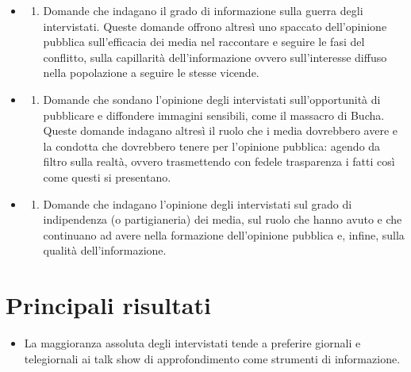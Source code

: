 \documentclass[
  openany]{book}
\providecommand{\tightlist}{%
  \setlength{\itemsep}{0pt}\setlength{\parskip}{0pt}}
\begin{document}
\begin{itemize}
\item
  \begin{enumerate}
  \def\labelenumi{\alph{enumi})}
  \tightlist
  \item
    Domande che indagano il grado di informazione sulla guerra degli intervistati. Queste domande offrono altresì uno spaccato dell'opinione pubblica sull'efficacia dei media nel raccontare e seguire le fasi del conflitto, sulla capillarità dell'informazione ovvero sull'interesse diffuso nella popolazione a seguire le stesse vicende.
  \end{enumerate}
\item
  \begin{enumerate}
  \def\labelenumi{\alph{enumi})}
  \setcounter{enumi}{1}
  \tightlist
  \item
    Domande che sondano l'opinione degli intervistati sull'opportunità di pubblicare e diffondere immagini sensibili, come il massacro di Bucha. Queste domande indagano altresì il ruolo che i media dovrebbero avere e la condotta che dovrebbero tenere per l'opinione pubblica: agendo da filtro sulla realtà, ovvero trasmettendo con fedele trasparenza i fatti così come questi si presentano.
  \end{enumerate}
\item
  \begin{enumerate}
  \def\labelenumi{\alph{enumi})}
  \setcounter{enumi}{2}
  \tightlist
  \item
    Domande che indagano l'opinione degli intervistati sul grado di indipendenza (o partigianeria) dei media, sul ruolo che hanno avuto e che continuano ad avere nella formazione dell'opinione pubblica e, infine, sulla qualità dell'informazione.
  \end{enumerate}
\end{itemize}

\hypertarget{principali-risultati-6}{%
\section{Principali risultati}\label{principali-risultati-6}}

\begin{itemize}
\tightlist
\item
  La maggioranza assoluta degli intervistati tende a preferire giornali e telegiornali ai talk show di approfondimento come strumenti di informazione.
\end{itemize}
\end{document}
